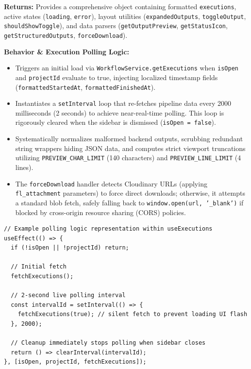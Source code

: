 \vspace{0.2cm}
\noindent\textbf{Returns:} Provides a comprehensive object containing formatted \texttt{executions}, active states (\texttt{loading}, \texttt{error}), layout utilities (\texttt{expandedOutputs}, \texttt{toggleOutput}, \texttt{shouldShowToggle}), and data parsers (\texttt{getOutputPreview}, \texttt{getStatusIcon}, \texttt{getStructuredOutputs}, \texttt{forceDownload}).

\vspace{0.2cm}
\noindent\textbf{Behavior \& Execution Polling Logic:}
\begin{itemize}
    \item Triggers an initial load via \texttt{WorkflowService.getExecutions} when \texttt{isOpen} and \texttt{projectId} evaluate to true, injecting localized timestamp fields (\texttt{formattedStartedAt}, \texttt{formattedFinishedAt}).
    \item Instantiates a \texttt{setInterval} loop that re-fetches pipeline data every 2000 milliseconds (2 seconds) to achieve near-real-time polling. This loop is rigorously cleared when the sidebar is dismissed (\texttt{isOpen = false}).
    \item Systematically normalizes malformed backend outputs, scrubbing redundant string wrappers hiding JSON data, and computes strict viewport truncations utilizing \texttt{PREVIEW\_CHAR\_LIMIT} (140 characters) and \texttt{PREVIEW\_LINE\_LIMIT} (4 lines).
    \item The \texttt{forceDownload} handler detects Cloudinary URLs (applying \texttt{fl\_attachment} parameters) to force direct downloads; otherwise, it attempts a standard blob fetch, safely falling back to \texttt{window.open(url, '\_blank')} if blocked by cross-origin resource sharing (CORS) policies.
\end{itemize}

\begin{lstlisting}
// Example polling logic representation within useExecutions
useEffect(() => {
  if (!isOpen || !projectId) return;

  // Initial fetch
  fetchExecutions();

  // 2-second live polling interval
  const intervalId = setInterval(() => {
    fetchExecutions(true); // silent fetch to prevent loading UI flash
  }, 2000);

  // Cleanup immediately stops polling when sidebar closes
  return () => clearInterval(intervalId);
}, [isOpen, projectId, fetchExecutions]);
\end{lstlisting}

